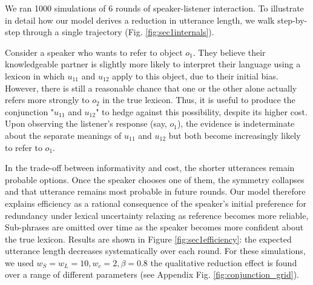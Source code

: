 We ran 1000 simulations of 6 rounds of speaker-listener interaction.
To illustrate in detail how our model derives a reduction in utterance length, we walk step-by-step through a single trajectory (Fig. \ref{fig:sec1internals}).

Consider a speaker who wants to refer to object $o_1$. 
They believe their knowledgeable partner is slightly more likely to interpret their language using a lexicon in which $u_{11}$ and $u_{12}$ apply to this object, due to their initial bias. 
However, there is still a reasonable chance that one or the other alone actually refers more strongly to $o_2$ in the true lexicon. 
Thus, it is useful to produce the conjunction "$u_{11}$ and $u_{12}$" to hedge against this possibility, despite its higher cost. 
Upon observing the listener's response (say, $o_1$), the evidence is indeterminate about the separate meanings of $u_{11}$ and $u_{12}$ but both become increasingly likely to refer to $o_1$. 

In the trade-off between informativity and cost, the shorter utterances remain probable options. 
Once the speaker chooses one of them, the symmetry collapses and that utterance remains most probable in future rounds. 
Our model therefore explains efficiency as a rational consequence of the speaker's initial preference for redundancy under lexical uncertainty relaxing as reference becomes more reliable, 
Sub-phrases are omitted over time as the speaker becomes more confident about the true lexicon. 
Results are shown in Figure \ref{fig:sec1efficiency}: the expected utterance length decreases systematically over each round. 
For these simulations, we used $w_S = w_L = 10, w_c = 2, \beta=0.8$ the qualitative reduction effect is found over a range of different parameters (see Appendix Fig. \ref{fig:conjunction_grid}). 
%
%
%


